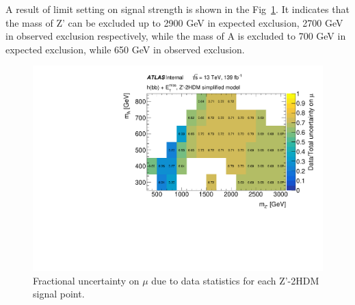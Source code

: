 \par A result of limit setting on signal strength is shown in the Fig~\ref{fig:zprime-2hdm-limit}. 
It indicates that the mass of Z' can be excluded up to 2900 GeV in expected exclusion, 2700 GeV in observed exclusion respectively, while the mass of A is excluded to 700 GeV in expected exclusion, while 650 GeV in observed exclusion.

\begin{figure}[!htb]
    \centering
    \includegraphics[width=0.75\linewidth]{chapters/c9/figures/ZPrime2HDMLimit.pdf}
    \caption{Fractional uncertainty on $\mu$ due to data statistics for each Z'-2HDM signal point.}
    \label{fig:zprime-2hdm-limit}
\end{figure}
